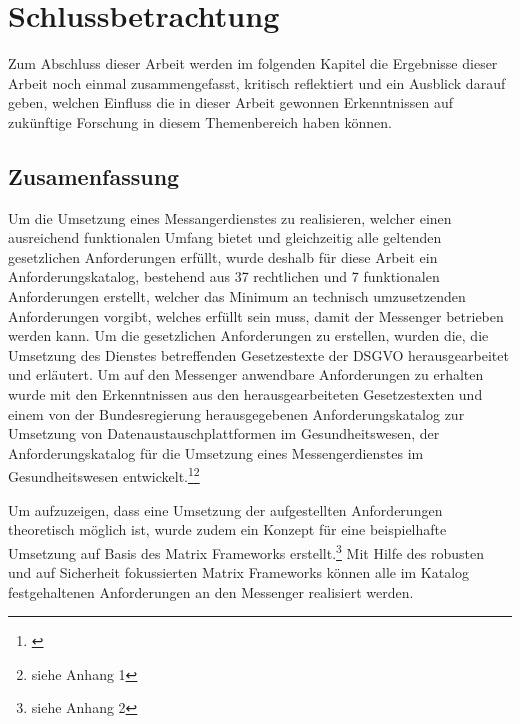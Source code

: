 \chapter{Schlussbetrachtung}\label{chapter:schlussbetrachtung}
Zum Abschluss dieser Arbeit werden im folgenden Kapitel die Ergebnisse dieser Arbeit noch einmal zusammengefasst, kritisch reflektiert und ein Ausblick darauf geben, welchen Einfluss die in dieser Arbeit gewonnen Erkenntnissen auf zukünftige Forschung in diesem Themenbereich haben können.

\section{Zusamenfassung}\label{chapter:kr}

Um die Umsetzung eines Messangerdienstes zu realisieren, welcher einen ausreichend funktionalen Umfang bietet und gleichzeitig alle geltenden gesetzlichen Anforderungen erfüllt, wurde deshalb für diese Arbeit ein Anforderungskatalog, bestehend aus 37 rechtlichen und 7 funktionalen Anforderungen erstellt, welcher das Minimum an technisch umzusetzenden Anforderungen vorgibt, welches erfüllt sein muss, damit der Messenger betrieben werden kann. Um die gesetzlichen Anforderungen zu erstellen, wurden die, die Umsetzung des Dienstes betreffenden Gesetzestexte der DSGVO herausgearbeitet und erläutert. Um auf den Messenger anwendbare Anforderungen zu erhalten wurde mit den Erkenntnissen aus den herausgearbeiteten Gesetzestexten und einem von der Bundesregierung herausgegebenen Anforderungskatalog zur Umsetzung von Datenaustauschplattformen im Gesundheitswesen, der Anforderungskatalog für die Umsetzung eines Messengerdienstes im Gesundheitswesen entwickelt.\footnote{\cite[S. 41]{Bundesverband-Gesundheits-IT-e.V.2016}}\footnote{siehe Anhang 1}

Um aufzuzeigen, dass eine Umsetzung der aufgestellten Anforderungen theoretisch möglich ist, wurde zudem ein Konzept für eine beispielhafte Umsetzung auf Basis des Matrix Frameworks erstellt.\footnote{siehe Anhang 2} Mit Hilfe des robusten und auf Sicherheit fokussierten Matrix Frameworks können alle im Katalog festgehaltenen Anforderungen an den Messenger realisiert werden. 

